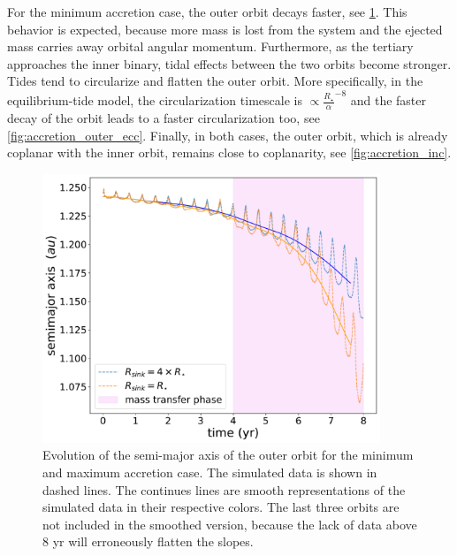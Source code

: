 For the minimum accretion case, the outer orbit decays faster, see \cref{fig:accretion_outer_semimajor_axis}. This behavior is expected, because more mass is lost from the system and the ejected mass carries away orbital angular momentum. Furthermore, as the tertiary approaches the inner binary, tidal effects between the two orbits become stronger. Tides tend to circularize and flatten the outer orbit. More specifically, in the equilibrium-tide model, the circularization timescale is $\propto \frac{R_{\star}}{\alpha}^{-8}$ and the faster decay of the orbit leads to a faster circularization too, see \cref{fig:accretion_outer_ecc}. Finally, in both cases, the outer orbit, which is already coplanar with the inner orbit, remains close to coplanarity, see \cref{fig:accretion_inc}.
\begin{figure}[H]
    \centering
    \includegraphics[width=0.9\textwidth]{Thesis/graphs/accretion_case/accretion_outer_semimajor_axis.pdf}
    \caption{Evolution of the semi-major axis of the outer orbit for the minimum and maximum accretion case. The simulated data is shown in dashed lines. The continues lines are smooth representations of the simulated data in their respective colors. The last three orbits are not included in the smoothed version, because the lack of data above $8$ yr will erroneously flatten the slopes.}
    \label{fig:accretion_outer_semimajor_axis}
\end{figure}

